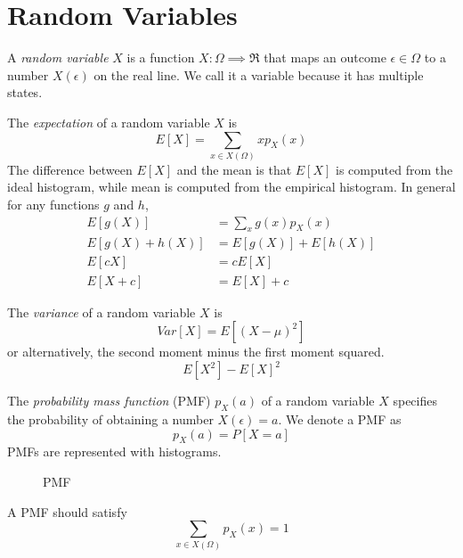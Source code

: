 \section{Random Variables}

A \emph{random variable} $X$ is a function $X : \Omega \implies \Re$
that maps an outcome $\epsilon \in \Omega$ to a number $X(\epsilon)$ on the real line.
We call it a variable because it has multiple states.

The \emph{expectation} of a random variable $X$ is
\begin{equation}
    E[X] = \sum_{x\in X(\Omega)} xp_X(x)
\end{equation}
The difference between $E[X]$ and the mean is
that $E[X]$ is computed from the ideal histogram,
while mean is computed from the empirical histogram.
In general for any functions $g$ and $h$,
\begin{align}
    E[g(X)]        & = \sum_{x} g(x)p_X(x) \\
    E[g(X) + h(X)] & = E[g(X)] + E[h(X)]   \\
    E[cX]          & = cE[X]               \\
    E[X + c]       & = E[X] + c
\end{align}

The \emph{variance} of a random variable $X$ is
\begin{equation}
    Var[X] = E\left[(X-\mu)^2\right]
\end{equation}
or alternatively, the second moment
minus the first moment squared.
\begin{equation}
    E[X^2] - E[X]^2
\end{equation}

The \emph{probability mass function} (PMF) $p_X(a)$
of a random variable $X$ specifies the probability of
obtaining a number $X(\epsilon) = a$. We denote a PMF as
\begin{equation}
    p_X(a) = P[X = a]
\end{equation}
PMFs are represented with histograms.
\begin{figure}[h]
    \centering
    \caption{PMF}
\end{figure}
A PMF should satisfy
\begin{equation}
    \sum_{x\in X(\Omega)} p_X(x) = 1
\end{equation}

